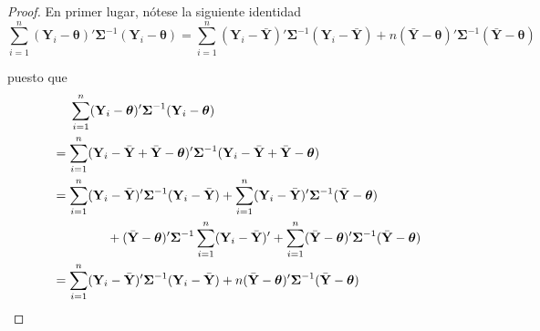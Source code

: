 \documentclass[
  10pt,
  spanish,
]{book}
\theoremstyle{definition}
\theoremstyle{definition}
\theoremstyle{definition}
\theoremstyle{definition}
\theoremstyle{remark}
\begin{document}
\begin{proof}
{}En primer lugar, nótese la siguiente identidad
\begin{equation}
\sum_{i=1}^n(\mathbf{Y}_i-\boldsymbol \theta)'\boldsymbol \Sigma^{-1}(\mathbf{Y}_i-\boldsymbol \theta)
=\sum_{i=1}^n(\mathbf{Y}_i-\bar{\mathbf{Y}})'\boldsymbol \Sigma^{-1}(\mathbf{Y}_i-\bar{\mathbf{Y}})
+n(\bar{\mathbf{Y}}-\boldsymbol \theta)'\boldsymbol \Sigma^{-1}(\bar{\mathbf{Y}}-\boldsymbol \theta)
\end{equation}

puesto que
\begin{align*}
&\ \ \ \ \sum_{i=1}^n(\mathbf{Y}_i-\boldsymbol \theta)'\boldsymbol \Sigma^{-1}(\mathbf{Y}_i-\boldsymbol \theta)\\
&=\sum_{i=1}^n(\mathbf{Y}_i-\bar{\mathbf{Y}}+\bar{\mathbf{Y}}-\boldsymbol \theta)'
\boldsymbol \Sigma^{-1}(\mathbf{Y}_i-\bar{\mathbf{Y}}+\bar{\mathbf{Y}}-\boldsymbol \theta)\\
&=\sum_{i=1}^n(\mathbf{Y}_i-\bar{\mathbf{Y}})'\boldsymbol \Sigma^{-1}(\mathbf{Y}_i-\bar{\mathbf{Y}})
+\sum_{i=1}^n(\mathbf{Y}_i-\bar{\mathbf{Y}})'\boldsymbol \Sigma^{-1}(\bar{\mathbf{Y}}-\boldsymbol \theta)\\
&\hspace{1.5cm}
+(\bar{\mathbf{Y}}-\boldsymbol \theta)'\boldsymbol \Sigma^{-1}\sum_{i=1}^n(\mathbf{Y}_i-\bar{\mathbf{Y}})'
+\sum_{i=1}^n(\bar{\mathbf{Y}}-\boldsymbol \theta)'\boldsymbol \Sigma^{-1}(\bar{\mathbf{Y}}-\boldsymbol \theta)\\
&=\sum_{i=1}^n(\mathbf{Y}_i-\bar{\mathbf{Y}})'\boldsymbol \Sigma^{-1}(\mathbf{Y}_i-\bar{\mathbf{Y}})
+n(\bar{\mathbf{Y}}-\boldsymbol \theta)'\boldsymbol \Sigma^{-1}(\bar{\mathbf{Y}}-\boldsymbol \theta)
\end{align*}


\end{proof}
\end{document}
